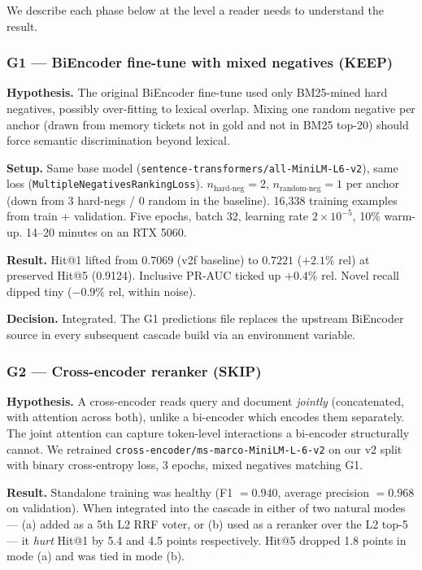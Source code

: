 We describe each phase below at the level a reader needs to understand the result.

\subsubsection{G1 --- BiEncoder fine-tune with mixed negatives (KEEP)}

\textbf{Hypothesis.} The original BiEncoder fine-tune used only BM25-mined hard negatives, possibly over-fitting to lexical overlap. Mixing one random negative per anchor (drawn from memory tickets not in gold and not in BM25 top-20) should force semantic discrimination beyond lexical.

\textbf{Setup.} Same base model (\texttt{sentence-transformers/all-MiniLM-L6-v2}), same loss (\texttt{MultipleNegativesRankingLoss}). $n_{\text{hard-neg}} = 2$, $n_{\text{random-neg}} = 1$ per anchor (down from 3 hard-negs / 0 random in the baseline). 16{,}338 training examples from train + validation. Five epochs, batch 32, learning rate $2 \times 10^{-5}$, 10\% warm-up. 14--20 minutes on an RTX 5060.

\textbf{Result.} Hit@1 lifted from $0.7069$ (v2f baseline) to $0.7221$ ($+2.1\%$ rel) at preserved Hit@5 (0.9124). Inclusive PR-AUC ticked up $+0.4\%$ rel. Novel recall dipped tiny ($-0.9\%$ rel, within noise).

\textbf{Decision.} Integrated. The G1 predictions file replaces the upstream BiEncoder source in every subsequent cascade build via an environment variable.

\subsubsection{G2 --- Cross-encoder reranker (SKIP)}

\textbf{Hypothesis.} A cross-encoder reads query and document \emph{jointly} (concatenated, with attention across both), unlike a bi-encoder which encodes them separately. The joint attention can capture token-level interactions a bi-encoder structurally cannot. We retrained \texttt{cross-encoder/ms-marco-MiniLM-L-6-v2} on our v2 split with binary cross-entropy loss, 3 epochs, mixed negatives matching G1.

\textbf{Result.} Standalone training was healthy (F1 $= 0.940$, average precision $= 0.968$ on validation). When integrated into the cascade in either of two natural modes --- (a) added as a 5th L2 RRF voter, or (b) used as a reranker over the L2 top-5 --- it \emph{hurt} Hit@1 by 5.4 and 4.5 points respectively. Hit@5 dropped 1.8 points in mode (a) and was tied in mode (b).

